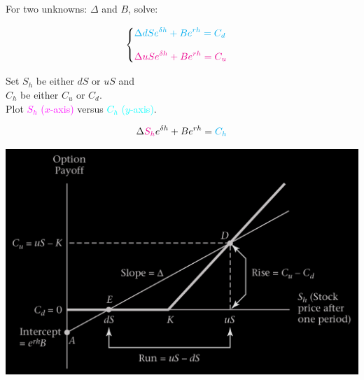 \begin{frame}[fragile,t]
	\begin{center}
		For two unknowns: $\Delta$ and  $B$, solve:
	\end{center}
	\begin{align*}
		\begin{cases}
			\displaystyle \textcolor{cyan}{\Delta d S e^{\delta h} + B e^{rh} = C_d}    \\[1em]
			\displaystyle \textcolor{magenta}{\Delta u S e^{\delta h} + B e^{rh} = C_u} \\
		\end{cases}
	\end{align*}

	\bigskip
	\mySeparateLine
	\bigskip
	\begin{center}
		Set $S_h$	be either $dS$ or  $uS$ and \\
		$C_h$	be either $C_u$ or  $C_d$. \\
		Plot \textcolor{magenta}{$S_h$ ($x$-axis)} versus  \textcolor{cyan}{$C_h$ ($y$-axis)}.
	\end{center}
	\begin{align*}
		\Delta \textcolor{magenta}{S_h} e^{\delta h} + B e^{rh} =\textcolor{cyan}{C_h}
	\end{align*}
\end{frame}
\begin{frame}[fragile,t]
\begin{center}
	\includegraphics[scale=0.25]{figs/Figure-10-2.png}
\end{center}
\end{frame}
